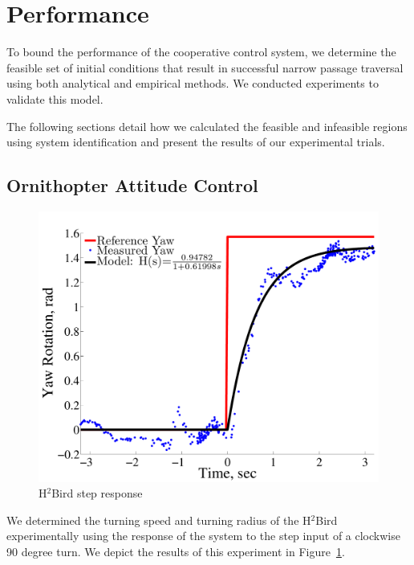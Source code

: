 \documentclass{aamas2013}
\begin{document}
\section{Performance}
\label{sec:performance}
To bound the performance of the cooperative control system, we determine 
the feasible set of initial conditions that result in successful narrow 
passage traversal using both analytical and empirical methods. We conducted 
experiments to validate this model.

The following sections detail how we calculated the feasible and infeasible
regions using system identification and present the results of our
experimental trials.

\subsection{Ornithopter Attitude Control}
\label{sec:flight_control}
\begin{figure}[tb]
\centering
\includegraphics[width=\linewidth]{figures/step_response_total.pdf}
\caption{H$^2$Bird step response}
\label{fig:step_response}
\end{figure}

We determined the turning speed and turning radius of the H$^2$Bird
experimentally using the response of the system to the step input of a
clockwise 90 degree turn. We depict the results of this experiment in
Figure~\ref{fig:step_response}. 
\end{document}
